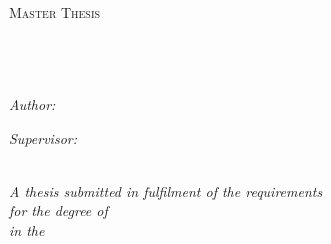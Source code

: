 \documentclass[11pt, a4paper, oneside]{Thesis} %
\begin{document}
\begin{titlepage}
\begin{center}

\textsc{\LARGE \univname}\\[1.5cm] %
\textsc{\Large Master Thesis}\\[0.5cm] %

\HRule \\[0.4cm] %
{\huge \bfseries \ttitle}\\[0.4cm] %
\HRule \\[1.5cm] %
 
\begin{minipage}{0.4\textwidth}
\begin{flushleft} \large
\emph{Author:}\\
{\authornames} %
\end{flushleft}
\end{minipage}
\begin{minipage}{0.4\textwidth}
\begin{flushright} \large
\emph{Supervisor:} \\
{\supname} %
\end{flushright}
\end{minipage}\\[3cm]
 
\large \textit{A thesis submitted in fulfilment of the requirements\\ for the degree of \degreename}\\[0.3cm] %
\textit{in the}\\[0.4cm] 
\groupname\\\deptname\\[2cm] %
 



\end{center}
\end{titlepage}
\end{document}
